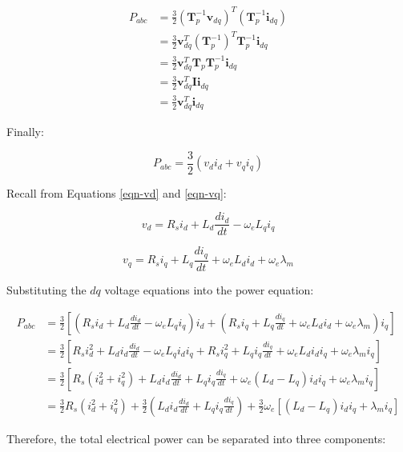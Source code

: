 \documentclass{article}
\begin{document}
\begin{align}
    P_{abc} 
    &= \frac{3}{2}(\mathbf{T}_p^{-1}\mathbf{v}_{dq})^T(\mathbf{T}_p^{-1}\mathbf{i}_{dq}) \\[4pt]
    &= \frac{3}{2}\mathbf{v}_{dq}^T(\mathbf{T}_p^{-1})^T\mathbf{T}_p^{-1}\mathbf{i}_{dq} \\[4pt]
    &= \frac{3}{2}\mathbf{v}_{dq}^T\mathbf{T}_p\mathbf{T}_p^{-1}\mathbf{i}_{dq} \\[4pt]
    &= \frac{3}{2}\mathbf{v}_{dq}^T\mathbf{I}\mathbf{i}_{dq} \\[4pt]
    &= \frac{3}{2}\mathbf{v}_{dq}^T\mathbf{i}_{dq}
\end{align}

Finally:

\begin{equation}
    P_{abc} = \frac{3}{2}(v_di_d + v_qi_q)
\end{equation}

Recall from Equations \ref{eqn-vd} and \ref{eqn-vq}:

\begin{equation}
    v_d = R_si_d + L_d\frac{di_d}{dt} - \omega_eL_qi_q
\end{equation}

\begin{equation}
    v_q = R_si_q + L_q\frac{di_q}{dt} + \omega_eL_di_d + \omega_e\lambda_m
\end{equation}

Substituting the $dq$ voltage equations into the power equation:

\begin{align}
P_{abc}
&=
\frac{3}{2}
\left[
\left(
R_s i_d
+
L_d\frac{di_d}{dt}
-
\omega_e L_q i_q
\right)i_d
+
\left(
R_s i_q
+
L_q\frac{di_q}{dt}
+
\omega_e L_d i_d
+
\omega_e\lambda_m
\right)i_q
\right]
\\[6pt]
&=
\frac{3}{2}
\left[
R_s i_d^2
+
L_d i_d\frac{di_d}{dt}
-
\omega_e L_q i_d i_q
+
R_s i_q^2
+
L_q i_q\frac{di_q}{dt}
+
\omega_e L_d i_d i_q
+
\omega_e\lambda_m i_q
\right]
\\[6pt]
&=
\frac{3}{2}
\left[
R_s(i_d^2+i_q^2)
+
L_d i_d\frac{di_d}{dt}
+
L_q i_q\frac{di_q}{dt}
+
\omega_e(L_d-L_q)i_d i_q
+
\omega_e\lambda_m i_q
\right]
\\[6pt]
&=
\frac{3}{2}R_s(i_d^2+i_q^2)
+
\frac{3}{2}
\left(
L_d i_d\frac{di_d}{dt}
+
L_q i_q\frac{di_q}{dt}
\right)
+
\frac{3}{2}\omega_e
\left[
(L_d-L_q)i_d i_q
+
\lambda_m i_q
\right]
\end{align}

Therefore, the total electrical power can be separated into three components:
\end{document}
